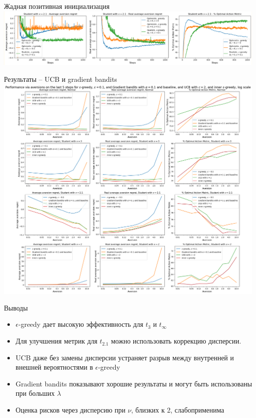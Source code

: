 \documentclass[10pt]{beamer} %
\begin{document}
\begin{frame}{Жадная позитивная инициализация}
    \includegraphics[scale=0.28,center]{images/experiments_aversion/greedy.png}
\end{frame}
\begin{frame}{Результаты -- UCB и gradient bandits}
    \includegraphics[scale=0.19,center]{images/overall.png}
\end{frame}
\begin{frame}{Выводы}
    \begin{itemize}
        \item<1-> $\epsilon$-greedy дает высокую эффективность для $t_3$ и $t_{\infty}$
        \item<2-> Для улучшения метрик для $t_{2.1}$ можно использовать коррекцию дисперсии.
        \item <3-> UCB даже без замены дисперсии устраняет разрыв между внутренней и внешней вероятностями в $\epsilon$-greedy
        \item <4-> Gradient bandits показывают хорошие результаты и могут быть использованы при больших $\lambda$
        \item <5-> Оценка рисков через дисперсию при $\nu$, близких к 2, слабоприменима
    \end{itemize}
\end{frame}
\end{document}
